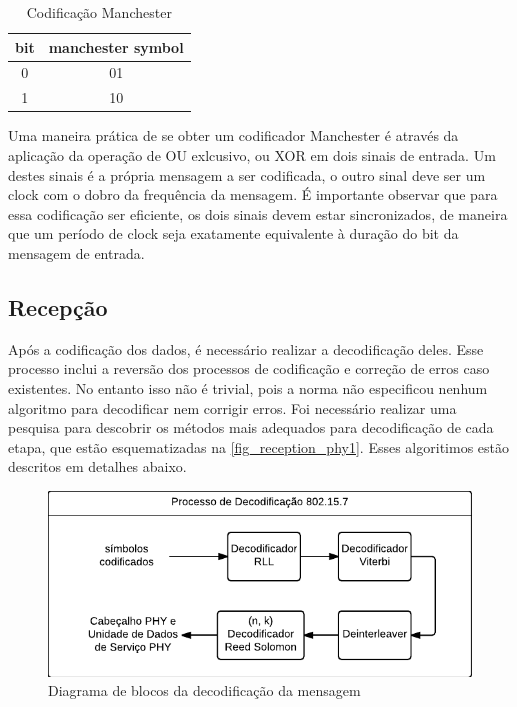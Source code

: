 	\begin{table}[ht]
		\caption{Codificação Manchester}
		\centering
		\begin{tabular}{c c}
			\hline
			bit & manchester symbol \\ \hline
			0 & 01 \\
			1 & 10 \\ \hline
		\end{tabular}
		\label{tabela_cod_manchester}
	\end{table}
	
	Uma maneira prática de se obter um codificador Manchester é através da aplicação da operação de OU exlcusivo, ou XOR em dois sinais de entrada. Um destes sinais é a própria mensagem a ser codificada, o outro sinal deve ser um clock com o dobro da frequência da mensagem. É importante observar que para essa codificação ser eficiente, os dois sinais devem estar sincronizados, de maneira que um período de clock seja exatamente equivalente à duração do bit da mensagem de entrada.	
	
	\subsection{Recepção}\label{section_norma_recepcao}
	
	Após a codificação dos dados, é necessário realizar a decodificação deles. Esse processo inclui a reversão dos processos de codificação e correção de erros caso existentes. No entanto isso não é trivial, pois a norma não especificou nenhum algoritmo para decodificar nem corrigir erros. Foi necessário realizar uma pesquisa para descobrir os métodos mais adequados para decodificação de cada etapa, que estão esquematizadas na \autoref{fig_reception_phy1}. Esses algoritimos estão descritos em detalhes abaixo.

	\begin{figure}[htb]
		\caption{\label{fig_reception_phy1} Diagrama de blocos da decodificação da mensagem}
		\centering
		\includegraphics[width=0.4\textheight]{PHY1-reception.pdf}
	\end{figure}
	

